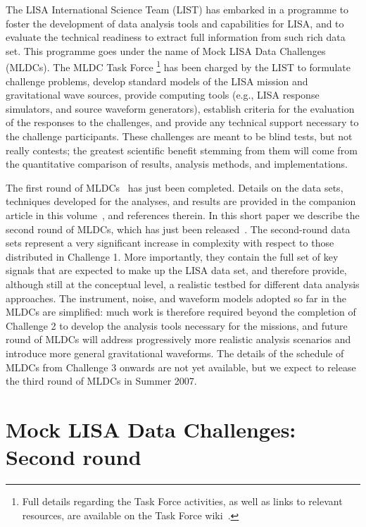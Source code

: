\documentclass[12pt]{iopart}
\begin{document}
The LISA International Science Team (LIST) has embarked in a programme to foster the development of data analysis tools and capabilities for LISA, and to evaluate the technical readiness to extract full information from such rich data set. This programme goes under the name of Mock LISA Data Challenges (MLDCs). The MLDC Task Force%
\footnote{Full details regarding the Task Force activities, as well as links to relevant resources, are available on the Task Force wiki~\cite{MLDCwiki}.}
% 
has been charged by the LIST to formulate challenge problems, develop standard models of the LISA mission and gravitational wave sources, provide computing tools (e.g., LISA response simulators, and source waveform generators), establish criteria for the evaluation of the responses to the challenges, and provide any technical support necessary to the challenge participants. These challenges are meant to be blind tests, but not really contests; the greatest scientific benefit stemming from them will come from the quantitative comparison of results, analysis methods, and implementations.

The first round of MLDCs~\cite{MLDCLISA06a,MLDCLISA06b} has just been completed. Details on the data sets, techniques developed for the analyses, and results are provided in the companion article in this volume~\cite{MLDC1-gwdaw}, and references therein. In this short paper we describe the second round of MLDCs, which has just been released~\cite{MLDCweb}. The second-round data sets represent a very significant increase in complexity with respect to those distributed in Challenge 1. More importantly, they contain the full set of key signals that are expected to make up the LISA data set, and therefore provide, although still at the conceptual level, a realistic testbed for different data analysis approaches. The instrument, noise, and waveform models adopted so far in the MLDCs are simplified: much work is therefore required beyond the completion of Challenge 2 to develop the analysis tools necessary for the missions, and future round of MLDCs will address progressively more realistic analysis scenarios and introduce more general gravitational waveforms. The details of the schedule of MLDCs from Challenge 3 onwards are not yet available, but we expect to release the third round of MLDCs in Summer 2007.

\section{Mock LISA Data Challenges: Second round}
\label{s:MLDC2}
\end{document}
